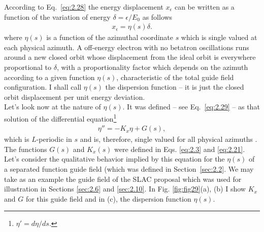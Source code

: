 According to Eq.~\eqref{eq:2.28} the energy displacement $x_\epsilon$ can be written as a function of the variation of energy $\delta = \epsilon/E_0$ as follows
\begin{align} \label{eq:3.3}
	x_\epsilon = \eta(s) \delta.
\end{align}
where $\eta(s)$ is a function of the azimuthal coordinate $s$ which is single valued at
each physical azimuth. A off-energy electron with no betatron oscillations runs around a new closed orbit whose displacement from the ideal orbit is everywhere proportional to $\delta$, with a proportionality factor which depends on the azimuth according to a given function $\eta(s)$, characteristic of the total guide field configuration. I shall call $\eta(s)$ the dispersion function -- it is just the closed orbit displacement per unit energy deviation.\\
Let’s look now at the nature of $\eta(s)$. It was defined -- see Eq.~\eqref{eq:2.29} -- as that
solution of the differential equation\footnote{$\eta' = d\eta/ds.$}
\begin{align}\label{eq:3.4}
	\eta'' = -K_x\eta + G(s),
\end{align}
which is $L$-periodic in $s$ and is, therefore, single valued for all physical azimuths . The functions $G(s)$ and $K_x(s)$ were defined in Eqs. \eqref{eq:2.3} and \eqref{eq:2.21}.\\
Let’s consider the qualitative behavior implied by this equation for the $\eta(s)$ of a separated function guide field (which was defined in Section~\ref{sec:2.2}. We may take
as an example the guide field of the SLAC proposal which was used for illustration in Sections \ref{sec:2.6} and \ref{sec:2.10}. In Fig. \ref{fig:fig29}(a), (b) I show $K_x$ and $G$ for this guide field and in (c), the dispersion function $\eta(s)$.
